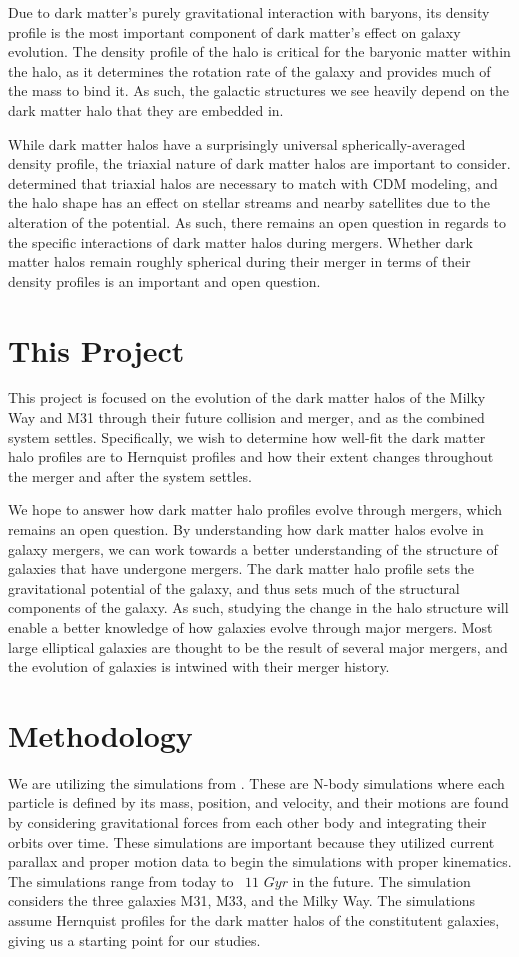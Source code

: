 \documentclass[linenumbers]{aastex631}
\begin{document}
Due to dark matter's purely gravitational interaction with baryons, its density profile is the most important component of dark matter's effect on galaxy evolution. The density profile of the halo is critical for the baryonic matter within the halo, as it determines the rotation rate of the galaxy and provides much of the mass to bind it. As such, the galactic structures we see heavily depend on the dark matter halo that they are embedded in.

While dark matter halos have a surprisingly universal spherically-averaged density profile, the triaxial nature of dark matter halos are important to consider. \cite{Meneghetti} determined that triaxial halos are necessary to match with CDM modeling, and the halo shape has an effect on stellar streams and nearby satellites due to the alteration of the potential. As such, there remains an open question in regards to the specific interactions of dark matter halos during mergers. Whether dark matter halos remain roughly spherical during their merger in terms of their density profiles is an important and open question.


\section{This Project}
This project is focused on the evolution of the dark matter halos of the Milky Way and M31 through their future collision and merger, and as the combined system settles. Specifically, we wish to determine how well-fit the dark matter halo profiles are to Hernquist profiles and how their extent changes throughout the merger and after the system settles.

We hope to answer how dark matter halo profiles evolve through mergers, which remains an open question. By understanding how dark matter halos evolve in galaxy mergers, we can work towards a better understanding of the structure of galaxies that have undergone mergers. The dark matter halo profile sets the gravitational potential of the galaxy, and thus sets much of the structural components of the galaxy. As such, studying the change in the halo structure will enable a better knowledge of how galaxies evolve through major mergers. Most large elliptical galaxies are thought to be the result of several major mergers, and the evolution of galaxies is intwined with their merger history.


\section{Methodology}
We are utilizing the simulations from \cite{sims}. These are N-body simulations where each particle is defined by its mass, position, and velocity, and their motions are found by considering gravitational forces from each other body and integrating their orbits over time. These simulations are important because they utilized current parallax and proper motion data to begin the simulations with proper kinematics. The simulations range from today to ~$11$ $Gyr$ in the future. The simulation considers the three galaxies M31, M33, and the Milky Way. The simulations assume Hernquist profiles for the dark matter halos of the constitutent galaxies, giving us a starting point for our studies.
\end{document}
